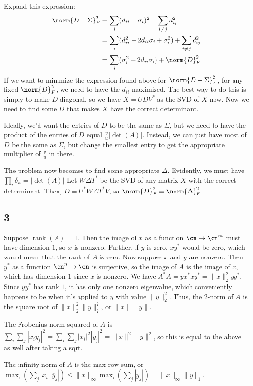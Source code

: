 \documentclass{article}
\newcommand{\conj}{\overline}
\DeclareMathOperator{\rank}{rank}
\begin{document}
Expand this expression: 
\begin{align*}
    \norm{D-\Sigma}_F^2&=\sum_i(d_{ii}-\sigma_i)^2+\sum_{i\neq j}d_{ij}^2\\
                       &=\sum_i(d_{ii}^2-2d_{ii}\sigma_i+\sigma_i^2)+\sum_{i\neq j}d_{ij}^2\\
                       &=\sum_i(\sigma_i^2-2d_{ii}\sigma_i)+\norm{D}_F^2
\end{align*}
If we want to minimize the expression found above for $\norm{D-\Sigma}_F^2$, for any fixed $\norm{D}_F^2$, we need to have the $d_{ii}$ maximized. The best way to do this is simply to make $D$ diagonal, so we have $X=UDV^*$ as the SVD of $X$ now. Now we need to find some $D$ that makes $X$ have the correct determinant.

Ideally, we'd want the entries of $D$ to be the same as $\Sigma$, but we need to have the product of the entries of $D$ equal $\frac{v}{u}|\det(A)|$. Instead, we can just have most of $D$ be the same as $\Sigma$, but change the smallest entry to get the appropriate multiplier of $\frac{v}{u}$ in there.

The problem now becomes to find some appropriate $\Delta$. Evidently, we must have $\prod_i\delta_{ii}=|\det(A)|$
Let $W\Delta T^*$ be the SVD of any matrix $X$ with the correct determinant. Then, $D=U^*W\Delta T^*V$, so $\norm{D}_F^2=\norm{\Delta}_F^2$.
\subsection*{3}
Suppose $\rank(A)=1$. Then the image of $x$ as a function $\cn\to\cn^m$ must have dimension $1$, so $x$ is nonzero. Further, if $y$ is zero, $xy^*$ would be zero, which would mean that the rank of $A$ is zero. Now suppose $x$ and $y$ are nonzero. Then $y^*$ as a function $\cn^n\to\cn$ is surjective, so the image of $A$ is the image of $x$, which has dimension $1$ since $x$ is nonzero.
We have $A^*A=yx^*xy^*=\|x\|_2^2yy^*$. Since $yy^*$ has rank $1$, it has only one nonzero eigenvalue, which conveniently happens to be when it's applied to $y$ with value $\|y\|_2^2$. Thus, the $2$-norm of $A$ is the square root of $\|x\|^2_2\|y\|_2^2$, or $\|x\|\|y\|$. 

The Frobenius norm squared of $A$ is $\sum_i\sum_j|x_i\conj{y}_j|^2=\sum_i\sum_j|x_i|^2|y_j|^2=\|x\|^2\|y\|^2$, so this is equal to the above as well after taking a sqrt.

The infinity norm of $A$ is the max row-sum, or $\max_i\left(\sum_j|x_i||\conj{y}_j|\right)\leq\|x\|_\infty\max_i\left(\sum_j|y_j|\right)=\|x\|_\infty\|y\|_1$.
\end{document}
